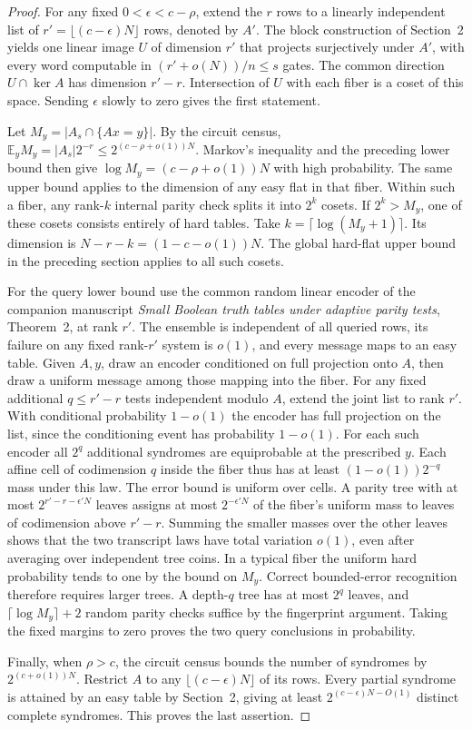 \begin{proof}
For any fixed $0<\epsilon<c-\rho$, extend the $r$ rows to a linearly independent list of $r'=\lfloor(c-\epsilon)N\rfloor$ rows, denoted by $A'$. The block construction of Section~2 yields one linear image $U$ of dimension $r'$ that projects surjectively under $A'$, with every word computable in $(r'+o(N))/n\le s$ gates. The common direction $U\cap\ker A$ has dimension $r'-r$. Intersection of $U$ with each fiber is a coset of this space. Sending $\epsilon$ slowly to zero gives the first statement.

Let $M_y=|A_s\cap\{Ax=y\}|$. By the circuit census,
$\mathbb E_y M_y=|A_s|2^{-r}\le 2^{(c-\rho+o(1))N}$.
Markov's inequality and the preceding lower bound then give $\log M_y=(c-\rho+o(1))N$ with high probability. The same upper bound applies to the dimension of any easy flat in that fiber. Within such a fiber, any rank-$k$ internal parity check splits it into $2^k$ cosets. If $2^k>M_y$, one of these cosets consists entirely of hard tables. Take $k=\lceil\log(M_y+1)\rceil$. Its dimension is $N-r-k=(1-c-o(1))N$. The global hard-flat upper bound in the preceding section applies to all such cosets.

For the query lower bound use the common random linear encoder of the companion manuscript \emph{Small Boolean truth tables under adaptive parity tests}, Theorem~2, at rank $r'$. The ensemble is independent of all queried rows, its failure on any fixed rank-$r'$ system is $o(1)$, and every message maps to an easy table. Given $A,y$, draw an encoder conditioned on full projection onto $A$, then draw a uniform message among those mapping into the fiber. For any fixed additional $q\le r'-r$ tests independent modulo $A$, extend the joint list to rank $r'$. With conditional probability $1-o(1)$ the encoder has full projection on the list, since the conditioning event has probability $1-o(1)$. For each such encoder all $2^q$ additional syndromes are equiprobable at the prescribed $y$. Each affine cell of codimension $q$ inside the fiber thus has at least $(1-o(1))2^{-q}$ mass under this law. The error bound is uniform over cells. A parity tree with at most $2^{r'-r-\epsilon' N}$ leaves assigns at most $2^{-\epsilon'N}$ of the fiber's uniform mass to leaves of codimension above $r'-r$. Summing the smaller masses over the other leaves shows that the two transcript laws have total variation $o(1)$, even after averaging over independent tree coins. In a typical fiber the uniform hard probability tends to one by the bound on $M_y$. Correct bounded-error recognition therefore requires larger trees. A depth-$q$ tree has at most $2^q$ leaves, and $\lceil\log M_y\rceil+2$ random parity checks suffice by the fingerprint argument. Taking the fixed margins to zero proves the two query conclusions in probability.

Finally, when $\rho>c$, the circuit census bounds the number of syndromes by $2^{(c+o(1))N}$. Restrict $A$ to any $\lfloor(c-\epsilon)N\rfloor$ of its rows. Every partial syndrome is attained by an easy table by Section~2, giving at least $2^{(c-\epsilon)N-O(1)}$ distinct complete syndromes. This proves the last assertion.
\end{proof}

